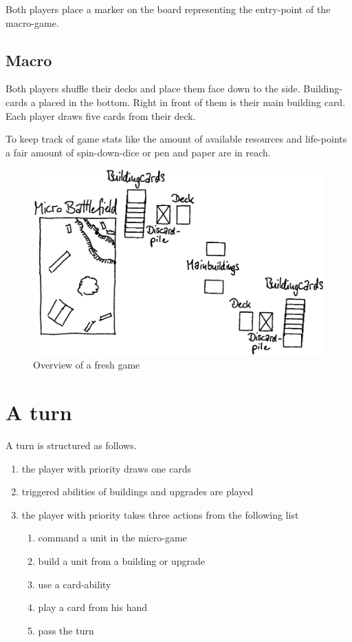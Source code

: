 \documentclass[a5paper,pagesize,10pt,bibtotoc,pointlessnumbers,
normalheadings,DIV=9,twoside=false]{scrbook}
\begin{document}
Both players place a marker on the board representing the entry-point of the macro-game.

\subsection{Macro}
Both players shuffle their decks and place them face down to the side. Building-cards a placed in the bottom. Right in front of them is their main building card. Each player draws five cards from their deck.

To keep track of game stats like the amount of available resources and life-points a fair amount of spin-down-dice or pen and paper are in reach.

\begin{figure}[t]
\includegraphics[scale=0.25]{Boardoverview}
\centering
\caption{Overview of a fresh game}
\end{figure}

\section{A turn}
A turn is structured as follows.

\begin{enumerate}
\item the player with priority draws one cards
\item triggered abilities of buildings and upgrades are played
\item the player with priority takes three actions from the following list
\begin{enumerate}
\item command a unit in the micro-game
\item build a unit from a building or upgrade
\item use a card-ability
\item play a card from his hand
\item pass the turn
\end{enumerate}
\end{enumerate}
\end{document}
